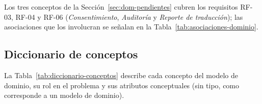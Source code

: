 
Los tres conceptos de la Sección~\ref{sec:dom-pendientes} cubren los
requisitos RF-03, RF-04 y RF-06 (\textit{Consentimiento},
\textit{Auditoría} y \textit{Reporte de traducción}); las asociaciones que
los involucran se señalan en la Tabla~\ref{tab:asociaciones-dominio}.

\subsection{Diccionario de conceptos}

La Tabla~\ref{tab:diccionario-conceptos} describe cada concepto del modelo
de dominio, su rol en el problema y sus atributos conceptuales (sin tipo,
como corresponde a un modelo de dominio).

